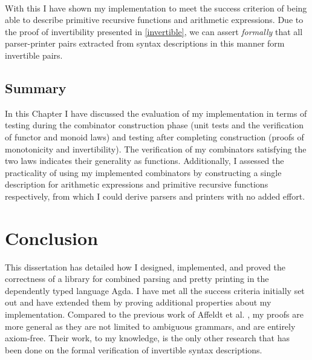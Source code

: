 \documentclass[12pt,a4paper,twoside,openright]{report}
\begin{document}
{\begin{code}
\> \AgdaSymbol{:}  \AgdaSymbol{(} \AgdaSymbol{(} \AgdaSymbol{)} \AgdaSymbol{(} \AgdaSymbol{))}  \<[63]%
\> \<%
\\
\> \AgdaSymbol{=} \<%
\end{code}

With this I have shown my implementation to meet the success criterion of being able to describe primitive recursive functions and arithmetic expressions. Due to the proof of invertibility presented in \autoref{invertible}, we can assert \emph{formally} that all parser-printer pairs extracted from syntax descriptions in this manner form invertible pairs.

\section{Summary}
In this Chapter I have discussed the evaluation of my implementation in terms of testing during the combinator construction phase (unit tests and the verification of functor and monoid laws) and testing after completing construction (proofs of monotonicity and invertibility). The verification of my combinators satisfying the two laws indicates their generality as functions. Additionally, I assessed the practicality of using my implemented combinators by constructing a single description for arithmetic expressions and primitive recursive functions respectively, from which I could derive parsers and printers with no added effort.

\chapter{Conclusion}

This dissertation has detailed how I designed, implemented, and proved the correctness of a library for combined parsing and pretty printing in the dependently typed language Agda.
I have met all the success criteria initially set out and have extended them by proving additional properties about my implementation.
Compared to the previous work of Affeldt et al. \cite{coq-invert}, my proofs are more general as they are not limited to ambiguous grammars, and are entirely axiom-free.
Their work, to my knowledge, is the only other research that has been done on the formal verification of invertible syntax descriptions.

}
\end{document}
